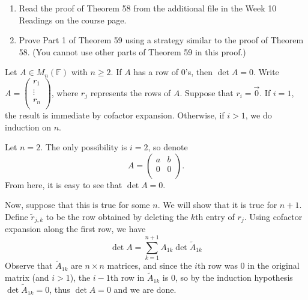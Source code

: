 \documentclass{eh-homework}
\begin{document}
    \begin{question}{3}
    \begin{enumerate}[label=(\alph*)]
        \item Read the proof of Theorem 58 from the additional file in the Week 10 Readings on the course page.
        \item Prove Part 1 of Theorem 59 using a strategy similar to the proof of Theorem 58. (You cannot use other parts of Theorem 59 in this proof.)
    \end{enumerate}
    Let \(A \in M_n(\mathbb{F})\) with \(n \geq 2\). If \(A\) has a row of 0's, then \(\det A = 0\).
    \tcblower
    Write \(A = \begin{pmatrix}
         r_1 \\
         \vdots \\
         r_n \\
    \end{pmatrix}\), where \(r_j\) represents the rows of \(A\). Suppose that \(r_i = \vec{0}\). If \(i = 1\), the result is immediate by cofactor expansion. Otherwise, if \(i > 1\), we do induction on \(n\).

    Let \(n = 2\). The only possibility is \(i = 2\), so denote
    \[
        A = \begin{pmatrix}
            a &  b \\
            0 &  0 \\
        \end{pmatrix}.
    \]
    From here, it is easy to see that \(\det A = 0\).

    Now, suppose that this is true for some \(n\). We will show that it is true for \(n + 1\). Define \(\tilde{r}_{j,k}\) to be the row obtained by deleting the \(k\)th entry of \(r_j\). Using cofactor expansion along the first row, we have
    \[
        \det A = \sum_{k=1}^{n+1} A_{1k}\det \tilde{A}_{1k}
    \]
    Observe that \(\tilde{A}_{1k}\) are \(n\times n\) matrices, and since the \(i\)th row was 0 in the original matrix (and \(i > 1\)), the \(i - 1\)th row in \(\tilde{A}_{1k}\) is 0, so by the induction hypothesis \(\det \tilde{A}_{1k} = 0\), thus \(\det A = 0\) and we are done.

    \end{question}
    
\end{document}
